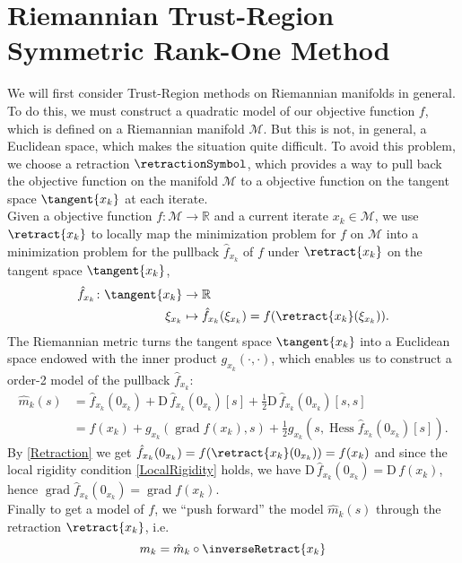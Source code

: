 \section{Riemannian Trust-Region Symmetric Rank-One Method}

We will first consider Trust-Region methods on Riemannian manifolds in general. To do this, we must construct a quadratic model of our objective function $f$, which is defined on a Riemannian manifold $\mathcal{M}$. But this is not, in general, a Euclidean space, which makes the situation quite difficult. To avoid this problem, we choose a retraction $\retractionSymbol$, which provides a way to pull back the objective function on the manifold $\mathcal{M}$ to a objective function on the tangent space $\tangent{x_k}$ at each iterate. \\
Given a objective function $f \colon \mathcal{M} \to \mathbb{R}$ and a current iterate $x_k \in \mathcal{M}$, we use $\retract{x_k}$ to locally map the minimization problem for $f$ on $\mathcal{M}$ into a minimization problem for the pullback $\hat{f}_{x_k}$ of $f$ under $\retract{x_k}$ on the tangent space $\tangent{x_k}$,
\begin{align*}
    \hat{f}_{x_k} \colon \tangent{x_k} & \to \mathbb{R} \\
    \xi_{x_k} & \mapsto \hat{f}_{x_k} (\xi_{x_k}) = f(\retract{x_k}(\xi_{x_k})).
\end{align*}
The Riemannian metric turns the tangent space $\tangent{x_k}$ into a Euclidean space endowed with the inner product $g_{x_k}(\cdot, \cdot)$, which enables us to construct a order-2 model of the pullback $\hat{f}_{x_k}$:
\begin{align*}
    \hat{m}_k( s ) & = \hat{f}_{x_k}(0_{x_k}) + \mathrm{D} \, \hat{f}_{x_k}(0_{x_k}) [s] + \frac{1}{2} \mathrm{D} \, \hat{f}_{x_k}(0_{x_k}) [s, s] \\
    & = f(x_k) + g_{x_k}(\operatorname{grad} f(x_k), s ) + \frac{1}{2} g_{x_k}( s, \operatorname{Hess} \hat{f}_{x_k}(0_{x_k}) [s]).
\end{align*}
By \cref{Retraction} we get $\hat{f}_{x_k}(0_{x_k}) = f(\retract{x_k}(0_{x_k})) = f(x_k)$ and since the local rigidity condition \cref{LocalRigidity} holds, we have $\mathrm{D} \, \hat{f}_{x_k}(0_{x_k}) = \mathrm{D} \, f(x_k)$, hence $\operatorname{grad} \hat{f}_{x_k}(0_{x_k}) = \operatorname{grad} f(x_k)$. \\
Finally to get a model of $f$, we “push forward” the model $\hat{m}_k(s)$ through the retraction $\retract{x_k}$, i.e.
\begin{equation}\label{RiemannianModel}
    m_k = \hat{m}_k \circ \inverseRetract{x_k}
\end{equation}

